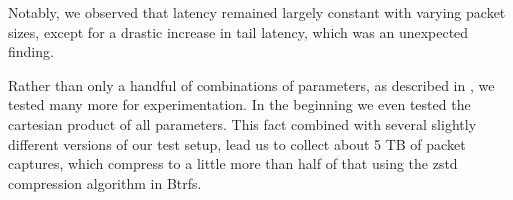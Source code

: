Notably, we observed that latency remained largely constant with varying packet sizes, except for a drastic increase in tail latency, which was an unexpected finding.






Rather than only a handful of combinations of parameters, as described in , we tested many more for experimentation.
In the beginning we even tested the cartesian product of all parameters.
This fact combined with several slightly different versions of our test setup, lead us to collect about 5 TB of packet captures, which compress to a little more than half of that using the zstd compression algorithm in Btrfs.


